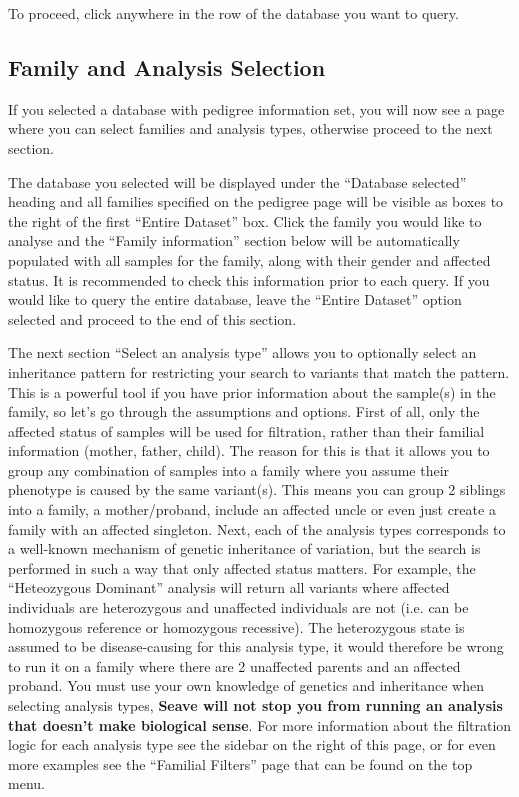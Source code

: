\documentclass[11pt, a4paper]{article}
\begin{document}
To proceed, click anywhere in the row of the database you want to query.

\subsection{Family and Analysis Selection}\label{familyAnalysisSelection}


If you selected a database with pedigree information set, you will now see a page where you can select families and analysis types, otherwise proceed to the next section.

The database you selected will be displayed under the ``Database selected'' heading and all families specified on the pedigree page will be visible as boxes to the right of the first ``Entire Dataset'' box. Click the family you would like to analyse and the ``Family information'' section below will be automatically populated with all samples for the family, along with their gender and affected status. It is recommended to check this information prior to each query. If you would like to query the entire database, leave the ``Entire Dataset'' option selected and proceed to the end of this section.

The next section ``Select an analysis type'' allows you to optionally select an inheritance pattern for restricting your search to variants that match the pattern. This is a powerful tool if you have prior information about the sample(s) in the family, so let's go through the assumptions and options. First of all, only the affected status of samples will be used for filtration, rather than their familial information (mother, father, child). The reason for this is that it allows you to group any combination of samples into a family where you assume their phenotype is caused by the same variant(s). This means you can group 2 siblings into a family, a mother/proband, include an affected uncle or even just create a family with an affected singleton. Next, each of the analysis types corresponds to a well-known mechanism of genetic inheritance of variation, but the search is performed in such a way that only affected status matters. For example, the ``Heteozygous Dominant'' analysis will return all variants where affected individuals are heterozygous and unaffected individuals are not (i.e. can be homozygous reference or homozygous recessive). The heterozygous state is assumed to be disease-causing for this analysis type, it would therefore be wrong to run it on a family where there are 2 unaffected parents and an affected proband. You must use your own knowledge of genetics and inheritance when selecting analysis types, \textbf{Seave will not stop you from running an analysis that doesn't make biological sense}. For more information about the filtration logic for each analysis type see the sidebar on the right of this page, or for even more examples see the ``Familial Filters'' page that can be found on the top menu.
\end{document}
